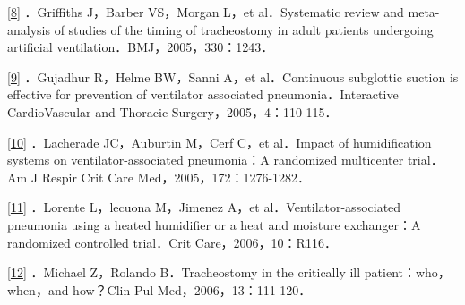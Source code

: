 \protect\hyperlink{text00015.htmlux5cux23ch8-14-back}{{[}8{]}}
．Griffiths J，Barber VS，Morgan L，et al．Systematic review and
meta-analysis of studies of the timing of tracheostomy in adult patients
undergoing artificial ventilation．BMJ，2005，330：1243．

\protect\hyperlink{text00015.htmlux5cux23ch9-14-back}{{[}9{]}}
．Gujadhur R，Helme BW，Sanni A，et al．Continuous subglottic suction is
effective for prevention of ventilator associated pneumonia．Interactive
CardioVascular and Thoracic Surgery，2005，4：110-115．

\protect\hyperlink{text00015.htmlux5cux23ch10-14-back}{{[}10{]}}
．Lacherade JC，Auburtin M，Cerf C，et al．Impact of humidification
systems on ventilator-associated pneumonia：A randomized multicenter
trial．Am J Respir Crit Care Med，2005，172：1276-1282．

\protect\hyperlink{text00015.htmlux5cux23ch11-14-back}{{[}11{]}}
．Lorente L，lecuona M，Jimenez A，et al．Ventilator-associated
pneumonia using a heated humidifier or a heat and moisture exchanger：A
randomized controlled trial．Crit Care，2006，10：R116．

\protect\hyperlink{text00015.htmlux5cux23ch12-14-back}{{[}12{]}}
．Michael Z，Rolando B．Tracheostomy in the critically ill
patient：who，when，and how？Clin Pul Med，2006，13：111-120．

\protect\hypertarget{text00016.html}{}{}


